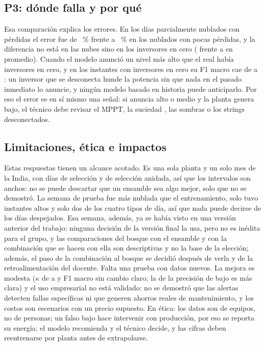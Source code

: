 \documentclass[conference]{IEEEtran}
\begin{document}
\subsection{P3: d\'onde falla y por qu\'e}
Esa comparaci\'on explica los errores. En los d\'ias parcialmente nublados con p\'erdidas el error fue de \gDosErr{}~\% frente a \gUnoErr{}~\% en los nublados con pocas p\'erdidas, y la diferencia no est\'a en las nubes sino en los inversores en cero (\gDosInv{} frente a \gUnoInv{} en promedio). Cuando el modelo anunci\'o un nivel m\'as alto que el real hab\'ia \invsobre{} inversores en cero, y en los \iecConN{} instantes con inversores en cero su F1 macro cae de \iecSinFinFmacro{} a \iecConFinFmacro{}: un inversor que se desconecta hunde la potencia sin que nada en el pasado inmediato lo anuncie, y ning\'un modelo basado en historia puede anticiparlo. Por eso el error es en s\'i mismo una se\~nal: si anuncia alto o medio y la planta genera bajo, el t\'ecnico debe revisar el MPPT, la suciedad \cite{diazgranados,costa}, las sombras \cite{yaouba,maki} o los strings desconectados.

\subsection{Limitaciones, \'etica e impactos}
Estas respuestas tienen un alcance acotado. Es una sola planta y un solo mes de la India, con \ndiassel{} d\'ias de selecci\'on y \ndiasanid{} de selecci\'on anidada, as\'i que los intervalos son anchos: no se puede descartar que un ensamble sea algo mejor, solo que no se demostr\'o. La semana de prueba fue m\'as nublada que el entrenamiento, solo tuvo \naltotest{} instantes altos y solo dos de los cuatro tipos de d\'ia, as\'i que nada puede decirse de los d\'ias despejados. Esa semana, adem\'as, ya se hab\'ia visto en una versi\'on anterior del trabajo: ninguna decisi\'on de la versi\'on final la usa, pero no es in\'edita para el grupo, y las comparaciones del bosque con el ensamble y con la combinaci\'on que se hacen con ella son descriptivas y no la base de la elecci\'on; adem\'as, el paso de la combinaci\'on al bosque se decidi\'o despu\'es de verla y de la retroalimentaci\'on del docente. Falta una prueba con datos nuevos. La mejora es modesta ($\kappa$ de \tPersKappa{} a \tFinKappa{} y F1 macro sin cambio claro; la de la precisi\'on de bajo es m\'as clara) y el uso empresarial no est\'a validado: no se demostr\'o que las alertas detecten fallas espec\'ificas ni que generen ahorros reales de mantenimiento, y los costos son escenarios con un precio supuesto. En \'etica: los datos son de equipos, no de personas; un falso bajo hace intervenir con producci\'on, por eso se reporta su energ\'ia; el modelo recomienda y el t\'ecnico decide, y las cifras deben reentrenarse por planta antes de extrapolarse.
\end{document}
